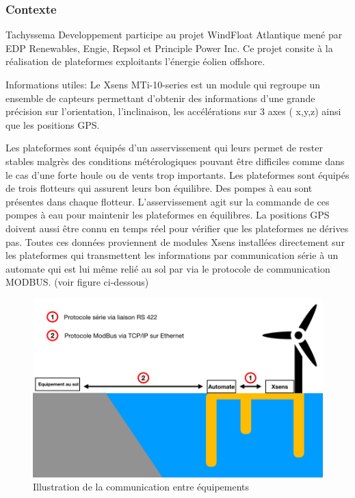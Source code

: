 \subsubsection{Contexte}

Tachyssema Developpement participe au projet WindFloat Atlantique mené par EDP Renewables, Engie, Repsol et Principle Power Inc. Ce projet consite à la réalisation de plateformes exploitants l'énergie éolien offshore. 

Informations utiles: Le Xsens MTi-10-series est un module qui regroupe un ensemble de capteurs permettant d'obtenir des informations d'une grande précision sur l'orientation, l'inclinaison, les accélérations sur 3 axes ( x,y,z) ainsi que les positions GPS. 
\newline

Les plateformes sont équipés d'un asservissement qui leurs permet de rester stables malgrès des conditions métérologiques pouvant être difficiles comme dans le cas d'une forte houle ou de vents trop importants. Les plateformes sont équipés de trois flotteurs qui assurent leurs bon équilibre. Des pompes à eau sont présentes dans chaque flotteur. L'asservissement agit sur la commande de ces pompes à eau pour maintenir les plateformes en équilibres. 
La positions GPS doivent aussi être connu en temps réel pour vérifier que les plateformes ne dérives pas. 
Toutes ces données proviennent de modules Xsens installées directement sur les plateformes qui transmettent les informations par communication série à un automate qui est lui même relié au sol par via le protocole de communication MODBUS.  (voir figure ci-dessous)
\newpage


\begin{figure}[ht]
    \centering
    \includegraphics[scale=0.45]{img/schKOWL.png}
    \caption{Illustration de la communication entre équipements }
    \label{fig:CameraCmdsettings}
\end{figure}

